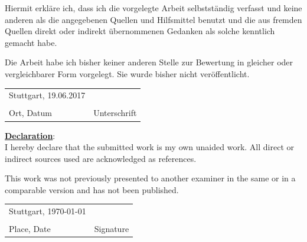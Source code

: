 \documentclass[paper=a4, fontsize=11pt]{scrartcl} %
\numberwithin{equation}{section} %
\numberwithin{figure}{section} %
\numberwithin{table}{section} %
\begin{document}
\noindent Hiermit erkl\"{a}re ich, dass ich die vorgelegte Arbeit selbstst\"{a}ndig verfasst und keine anderen als die angegebenen Quellen und Hilfsmittel benutzt und die aus fremden Quellen direkt oder indirekt \"{u}bernommenen Gedanken als solche kenntlich gemacht habe.

\noindent Die Arbeit habe ich bisher keiner anderen Stelle zur Bewertung in gleicher oder vergleichbarer Form vorgelegt. Sie wurde bisher nicht ver\"{o}ffentlicht.

\vspace{40pt}
\noindent\begin{tabular}{ll}
	Stuttgart, 19.06.2017 & \\
	\makebox[2.5in]{\hrulefill} & \makebox[2.5in]{\hrulefill}\\
	Ort, Datum & Unterschrift\\[8ex]%
\end{tabular}

\noindent \textbf{\underline{Declaration}}:\\

\noindent I hereby declare that the submitted work is my own unaided work. All direct or indirect sources used are acknowledged as references.

\noindent This work was not previously presented to another examiner in the same or in a comparable version and has not been published.

\vspace{40pt}
\noindent\begin{tabular}{ll}
	Stuttgart, \today & \\
	\makebox[2.5in]{\hrulefill} & \makebox[2.5in]{\hrulefill}\\
	Place, Date & Signature\\[8ex]%
\end{tabular}
\end{document}
